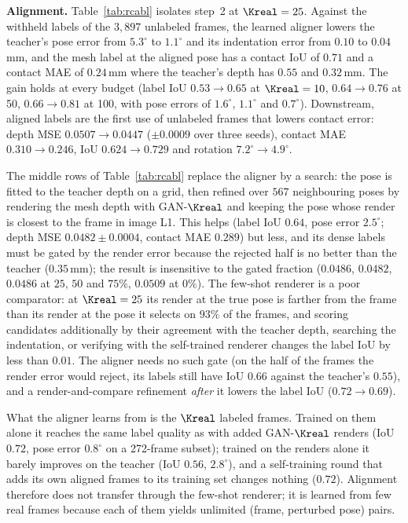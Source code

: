 \noindent\textbf{Alignment.} Table~\ref{tab:rcabl} isolates step~2 at $\Kreal=25$. Against the withheld labels of the $3{,}897$ unlabeled frames, the learned aligner lowers the teacher's pose error from $5.3^\circ$ to $1.1^\circ$ and its indentation error from $0.10$ to $0.04\,$mm, and the mesh label at the aligned pose has a contact IoU of $0.71$ and a contact MAE of $0.24\,$mm where the teacher's depth has $0.55$ and $0.32\,$mm. The gain holds at every budget (label IoU $0.53\!\to\!0.65$ at $\Kreal=10$, $0.64\!\to\!0.76$ at 50, $0.66\!\to\!0.81$ at 100, with pose errors of $1.6^\circ$, $1.1^\circ$ and $0.7^\circ$). Downstream, aligned labels are the first use of unlabeled frames that lowers contact error: depth MSE $0.0507\!\to\!0.0447$ ($\pm0.0009$ over three seeds), contact MAE $0.310\!\to\!0.246$, IoU $0.624\!\to\!0.729$ and rotation $7.2^\circ\!\to\!4.9^\circ$.

The middle rows of Table~\ref{tab:rcabl} replace the aligner by a search: the pose is fitted to the teacher depth on a grid, then refined over $567$ neighbouring poses by rendering the mesh depth with GAN-$\Kreal$ and keeping the pose whose render is closest to the frame in image L1. This helps (label IoU $0.64$, pose error $2.5^\circ$; depth MSE $0.0482\pm0.0004$, contact MAE $0.289$) but less, and its dense labels must be gated by the render error because the rejected half is no better than the teacher ($0.35\,$mm); the result is insensitive to the gated fraction ($0.0486$, $0.0482$, $0.0486$ at $25$, $50$ and $75\%$, $0.0509$ at $0\%$). The few-shot renderer is a poor comparator: at $\Kreal=25$ its render at the true pose is farther from the frame than its render at the pose it selects on $93\%$ of the frames, and scoring candidates additionally by their agreement with the teacher depth, searching the indentation, or verifying with the self-trained renderer changes the label IoU by less than $0.01$. The aligner needs no such gate (on the half of the frames the render error would reject, its labels still have IoU $0.66$ against the teacher's $0.55$), and a render-and-compare refinement \emph{after} it lowers the label IoU ($0.72\!\to\!0.69$).

What the aligner learns from is the $\Kreal$ labeled frames. Trained on them alone it reaches the same label quality as with added GAN-$\Kreal$ renders (IoU $0.72$, pose error $0.8^\circ$ on a 272-frame subset); trained on the renders alone it barely improves on the teacher (IoU $0.56$, $2.8^\circ$), and a self-training round that adds its own aligned frames to its training set changes nothing ($0.72$). Alignment therefore does not transfer through the few-shot renderer; it is learned from few real frames because each of them yields unlimited (frame, perturbed pose) pairs.

